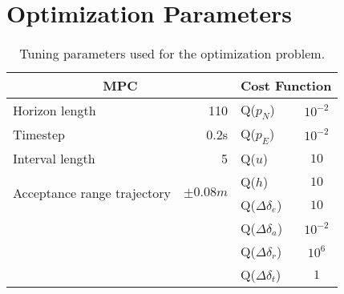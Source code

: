 \newpage
\section{Optimization Parameters}

\begin{table}[h]
\centering
\begin{tabular}{| l r | l c |}
    \hline
    \multicolumn{2}{|c|}{MPC} & \multicolumn{2}{c|}{Cost Function} \\
    \hline
    Horizon length & 110 & Q($p_N$) & $10^{-2}$\\
    Timestep       & 0.2s & Q($p_E$) & $10^{-2}$\\
    Interval length & 5 & Q($u$) & $10$\\
    \multirow{2}{2.5cm}{Acceptance range trajectory} & \multirow{2}{*}{$\pm 0.08m$} & Q($h$) & $10$\\
    & & Q($\Delta \delta_e$) & $10$\\
    & & Q($\Delta \delta_a$) & $10^{-2}$\\
    & & Q($\Delta \delta_r$) & $10^{6}$\\
    & & Q($\Delta \delta_t$) & $1$\\
    \hline
\end{tabular}
\caption{Tuning parameters used for the optimization problem.}
\label{tab:opt_param}
\end{table}